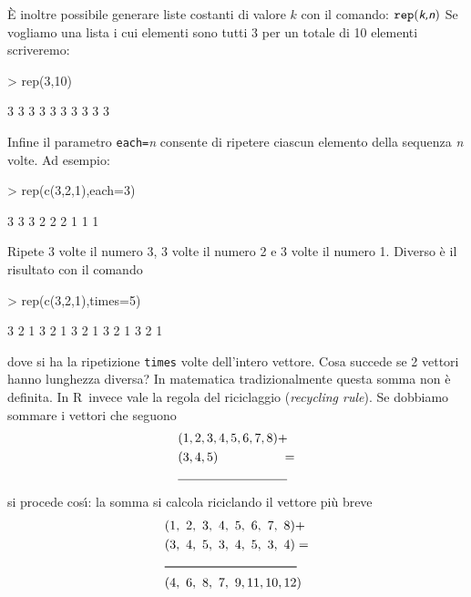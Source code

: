 \documentclass[onecolumn,11pt]{book}
\newcommand{\varia}[1]{\textsl{\textsf{#1}}}
\newcommand{\rpr}{\textsf{R}~}
\begin{document}
\`E inoltre possibile generare liste costanti di valore $k$ con il comando:
$\texttt{rep} (\varia{k,n})$
Se vogliamo una lista i cui elementi sono tutti 3 per un totale di 10 elementi scriveremo:
\begin{Schunk}
\begin{Sinput}
> rep(3,10)
\end{Sinput}
\begin{Soutput}
 [1] 3 3 3 3 3 3 3 3 3 3
\end{Soutput}
\end{Schunk}
Infine il parametro \texttt{each=}\varia{n} consente di ripetere ciascun elemento della sequenza \varia{n} volte. Ad esempio:
\begin{Schunk}
\begin{Sinput}
> rep(c(3,2,1),each=3)
\end{Sinput}
\begin{Soutput}
[1] 3 3 3 2 2 2 1 1 1
\end{Soutput}
\end{Schunk}
Ripete 3 volte il numero 3, 3 volte il numero 2 e 3 volte il numero 1. 
Diverso \`e il risultato con il comando 
\begin{Schunk}
\begin{Sinput}
> rep(c(3,2,1),times=5)
\end{Sinput}
\begin{Soutput}
 [1] 3 2 1 3 2 1 3 2 1 3 2 1 3 2 1
\end{Soutput}
\end{Schunk}
dove si ha la ripetizione \texttt{times} volte dell'intero vettore.
Cosa succede se 2 vettori hanno lunghezza diversa? In matematica tradizionalmente questa somma non \`e definita. In \rpr invece vale la regola del riciclaggio  (\textit{recycling rule}). Se dobbiamo sommare i vettori che seguono 
 \begin{align*} &(1,2,3,4,5,6,7,8)+\\ &(3,4,5)\hskip50pt =\\
 &\noindent\rule{0.25\textwidth}{0.4pt}\\
\end{align*} 
si procede cos\'\i: la somma
si calcola riciclando il vettore pi\`u breve
 \begin{align} 
&(1,~2,~3,~4,~5,~6,~7,~8)+\\
&(3,~4,~5,~3,~4,~5,~3,~4)=\\
&\noindent\rule{0.3\textwidth}{0.8pt} \\
&(4, ~ 6,~  8 ,~ 7,~  9 ,11, 10,12)\\
\end{align}
\end{document}
